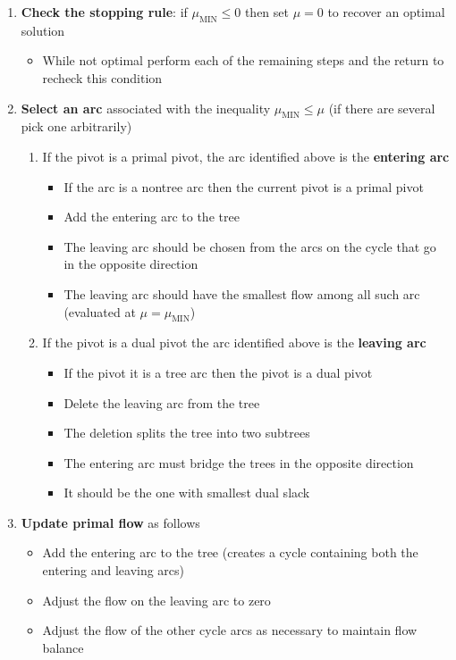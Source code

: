 \documentclass[11pt]{article}
\begin{document}
\begin{itemize}
\begin{enumerate}
\item \textbf{Check the stopping rule}: if \(\mu_{\text{MIN}} \leq 0\) then set \(\mu = 0\) to recover an optimal solution
\begin{itemize}
\item While not optimal perform each of the remaining steps and the return to recheck this condition
\end{itemize}
\item \textbf{Select an arc} associated with the inequality \(\mu_{\text{MIN}} \leq \mu\) (if there are several pick one arbitrarily)
\begin{enumerate}
\item If the pivot is a primal pivot, the arc identified above is the \textbf{entering arc}
\begin{itemize}
\item If the arc is a nontree arc then the current pivot is a primal pivot
\item Add the entering arc to the tree
\item The leaving arc should be chosen from the arcs on the cycle that go in the opposite direction
\item The leaving arc should have the smallest flow among all such arc (evaluated at \(\mu = \mu_\text{MIN}\))
\end{itemize}
\item If the pivot is a dual pivot the arc identified above is the \textbf{leaving arc}
\begin{itemize}
\item If the pivot it is a tree arc then the pivot is a dual pivot
\item Delete the leaving arc from the tree
\item The deletion splits the tree into two subtrees
\item The entering arc must bridge the trees in the opposite direction
\item It should be the one with smallest dual slack
\end{itemize}
\end{enumerate}
\item \textbf{Update primal flow} as follows
\begin{itemize}
\item Add the entering arc to the tree (creates a cycle containing both the entering and leaving arcs)
\item Adjust the flow on the leaving arc to zero
\item Adjust the flow of the other cycle arcs as necessary to maintain flow balance

\end{itemize}
\end{enumerate}
\end{itemize}
\end{document}
